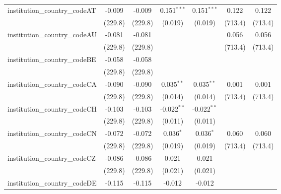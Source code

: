 \begin{tabular}{lcccccc}
   institution\_country\_codeAT          & -0.009         & -0.009         & 0.151$^{***}$  & 0.151$^{***}$  & 0.122         & 0.122\\   
                                         & (229.8)        & (229.8)        & (0.019)        & (0.019)        & (713.4)       & (713.4)\\   
   institution\_country\_codeAU          & -0.081         & -0.081         &                &                & 0.056         & 0.056\\   
                                         & (229.8)        & (229.8)        &                &                & (713.4)       & (713.4)\\   
   institution\_country\_codeBE          & -0.058         & -0.058         &                &                &               &   \\   
                                         & (229.8)        & (229.8)        &                &                &               &   \\   
   institution\_country\_codeCA          & -0.090         & -0.090         & 0.035$^{**}$   & 0.035$^{**}$   & 0.001         & 0.001\\   
                                         & (229.8)        & (229.8)        & (0.014)        & (0.014)        & (713.4)       & (713.4)\\   
   institution\_country\_codeCH          & -0.103         & -0.103         & -0.022$^{**}$  & -0.022$^{**}$  &               &   \\   
                                         & (229.8)        & (229.8)        & (0.011)        & (0.011)        &               &   \\   
   institution\_country\_codeCN          & -0.072         & -0.072         & 0.036$^{*}$    & 0.036$^{*}$    & 0.060         & 0.060\\   
                                         & (229.8)        & (229.8)        & (0.019)        & (0.019)        & (713.4)       & (713.4)\\   
   institution\_country\_codeCZ          & -0.086         & -0.086         & 0.021          & 0.021          &               &   \\   
                                         & (229.8)        & (229.8)        & (0.021)        & (0.021)        &               &   \\   
   institution\_country\_codeDE          & -0.115         & -0.115         & -0.012         & -0.012         &               &   \\   

\end{tabular}
